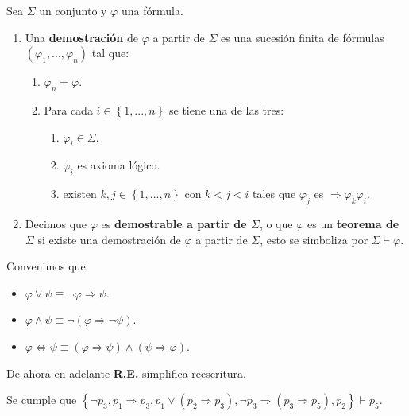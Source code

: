 \documentclass[12pt]{report}
\newcounter{it}
\theoremstyle{largebreak}
\begin{document}
    \begin{mydef}
        Sea $\Sigma$ un conjunto y $\varphi$ una fórmula.
        \begin{enumerate}
            \item Una \textbf{demostración} de $\varphi$ a partir de $\Sigma$ es una sucesión finita de fórmulas $(\varphi_1,...,\varphi_n)$ tal que:
            \begin{enumerate}
                \item $\varphi_n=\varphi$.
                \item Para cada $i\in\left\{1,...,n\right\}$ se tiene una de las tres:
                \begin{enumerate}
                    \item $\varphi_i\in\Sigma$.
                    \item $\varphi_i$ es axioma lógico.
                    \item existen $k,j\in\left\{1,...,n\right\}$ con $k<j<i$ tales que $\varphi_j$ es $\Rightarrow\varphi_k\varphi_i$.
                \end{enumerate}
            \end{enumerate}
            \item Decimos que $\varphi$ es \textbf{demostrable a partir de $\Sigma$}, o que $\varphi$ es un \textbf{teorema de $\Sigma$} si existe una demostración de $\varphi$ a partir de $\Sigma$, esto se simboliza por $\Sigma\vdash\varphi$.
        \end{enumerate}
    \end{mydef}

    \begin{mydef}
        Convenimos que
        \begin{itemize}
            \item $\varphi\lor\psi\equiv\neg\varphi\Rightarrow\psi$.
            \item $\varphi\land\psi\equiv\neg(\varphi\Rightarrow\neg\psi)$.
            \item $\varphi\iff\psi\equiv(\varphi\Rightarrow\psi)\land(\psi\Rightarrow\varphi)$.
        \end{itemize}
    \end{mydef}

    \begin{obs}
        De ahora en adelante \textbf{R.E.} simplifica reescritura.
    \end{obs}

    \begin{exa}
        Se cumple que $\left\{\neg p_3,p_1\Rightarrow p_3,p_1\lor(p_2\Rightarrow p_3),\neg p_3\Rightarrow(p_3\Rightarrow p_5),p_2 \right\}\vdash p_5$.    
    \end{exa}
\end{document}
